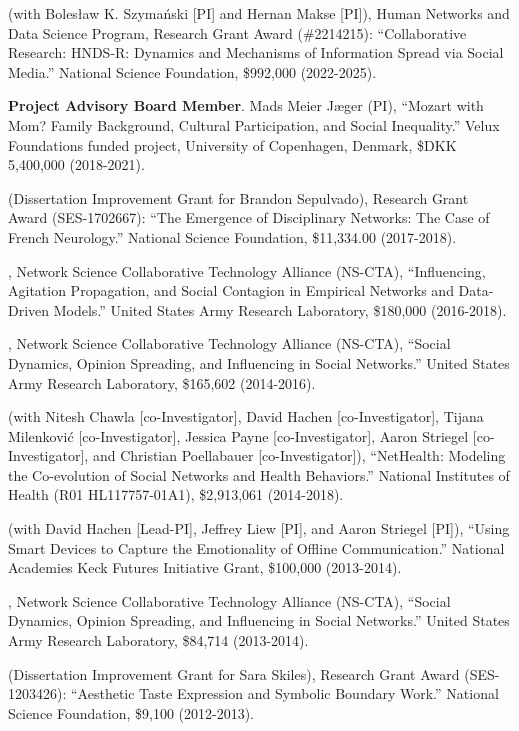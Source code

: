  (with Boles\l{}aw K. Szyma\'{n}ski [PI] and Hernan Makse [PI]), Human Networks and Data Science Program, Research Grant Award (\#2214215): ``Collaborative Research: HNDS-R: Dynamics and Mechanisms of
Information Spread via Social Media.'' National Science Foundation, \$992,000 (2022-2025).

\ind\textbf{Project Advisory Board Member}. Mads Meier Jæger (PI),
``Mozart with Mom? Family Background, Cultural Participation, and Social Inequality.'' Velux Foundations funded project, University of Copenhagen, Denmark, \$DKK 5,400,000 (2018-2021).

 (Dissertation Improvement Grant for Brandon Sepulvado), Research Grant Award (SES-1702667): ``The Emergence of Disciplinary Networks: The Case of French Neurology.'' National Science Foundation, \$11,334.00 (2017-2018).

, Network Science Collaborative Technology Alliance (NS-CTA), ``Influencing, Agitation Propagation, and Social Contagion in Empirical Networks and Data-Driven Models.'' United States Army Research Laboratory, \$180,000 (2016-2018).

, Network Science Collaborative Technology Alliance (NS-CTA), ``Social Dynamics, Opinion Spreading, and Influencing in Social Networks.'' United States Army Research Laboratory, \$165,602 (2014-2016).

 (with Nitesh Chawla [co-Investigator], David Hachen [co-Investigator], Tijana Milenkovi\'{c} [co-Investigator], Jessica Payne [co-Investigator], Aaron Striegel [co-Investigator], and Christian Poellabauer [co-Investigator]), ``NetHealth: Modeling the Co-evolution of Social Networks and Health Behaviors.'' National Institutes of Health (R01 HL117757-01A1), \$2,913,061 (2014-2018).
 
 (with  David Hachen [Lead-PI], Jeffrey Liew [PI], and Aaron Striegel [PI]), ``Using Smart Devices to Capture the Emotionality of Offline Communication.'' National Academies Keck Futures Initiative Grant, \$100,000 (2013-2014).

, Network Science Collaborative Technology Alliance (NS-CTA), ``Social Dynamics, Opinion Spreading, and Influencing in Social Networks.'' United States Army Research Laboratory, \$84,714 (2013-2014).

 (Dissertation Improvement Grant for Sara Skiles), Research Grant Award (SES-1203426): ``Aesthetic Taste Expression and Symbolic Boundary Work.''  National Science Foundation, \$9,100 (2012-2013).

